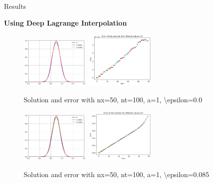 \begin{frame}{Results}
  
    \textbf{Using Deep Lagrange Interpolation}
    \begin{figure}
        \centering
        \includegraphics[width=0.3\textwidth]{images/sol3.png}
        \includegraphics[width=0.3\textwidth]{images/errors2.png}
        \caption{Solution and error with nx=50, nt=100, a=1, \textbackslash epsilon=0.0}
    \end{figure}
    \begin{figure}
        \centering
        \includegraphics[width=0.3\textwidth]{images/sol4.png}
        \includegraphics[width=0.3\textwidth]{images/errors3.png}
        \caption{Solution and error with nx=50, nt=100, a=1, \textbackslash epsilon=0.085}
    \end{figure}
     
 \end{frame}
 